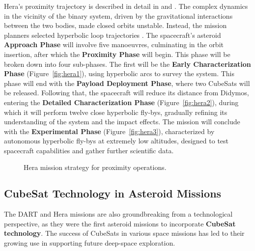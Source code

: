 \documentclass{Configuration_gigi/PoliMi3i_thesis}
\begin{document}
Hera's proximity trajectory is described in detail in \cite{hera} and \cite{heraGNC}. The complex dynamics in the vicinity of the binary system, driven by the gravitational interactions between the two bodies, made closed orbits unstable. Instead, the mission planners selected hyperbolic loop trajectories \cite{heraGNC}. The spacecraft's asteroid \textbf{Approach Phase} will involve five manoeuvres, culminating in the orbit insertion, after which the \textbf{Proximity Phase} will begin. This phase will be broken down into four sub-phases. The first will be the \textbf{Early Characterization Phase} (Figure~\ref{fig:hera1}), using hyperbolic arcs to survey the system. This phase will end with the \textbf{Payload Deployment Phase}, where two CubeSats will be released. Following that, the spacecraft will reduce its distance from Didymos, entering the \textbf{Detailed Characterization Phase} (Figure~\ref{fig:hera2}), during which it will perform twelve close hyperbolic fly-bys, gradually refining its understanding of the system and the impact effects. The mission will conclude with the \textbf{Experimental Phase} (Figure~\ref{fig:hera3}), characterized by autonomous hyperbolic fly-bys at extremely low altitudes, designed to test spacecraft capabilities and gather further scientific data.

\begin{figure}[H]
    \centering
    \caption[Hera proximity operations.]{Hera mission strategy for proximity operations.}
    \label{fig:heraCPO}
\end{figure}


\subsection{CubeSat Technology in Asteroid Missions}\label{Ssec:CubeSat Technology in Asteroid Missions}

The DART and Hera missions are also groundbreaking from a technological perspective, as they were the first asteroid missions to incorporate \textbf{CubeSat technology}. The success of CubeSats in various space missions has led to their growing use in supporting future deep-space exploration.
\end{document}
